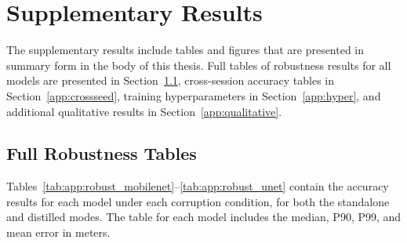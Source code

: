 \chapter{Supplementary Results}
\label{app:supplementary}

The supplementary results include tables and figures that are presented in summary form in the body of
this thesis. Full tables of robustness results for all models are presented in
Section~\ref{app:robustness}, cross-session accuracy tables in Section~\ref{app:crossseed}, training
hyperparameters in Section~\ref{app:hyper}, and additional qualitative results in
Section~\ref{app:qualitative}.

\section{Full Robustness Tables}
\label{app:robustness}

Tables~\ref{tab:app:robust_mobilenet}--\ref{tab:app:robust_unet} contain the accuracy results for each
model under each corruption condition, for both the standalone and distilled modes. The table for each
model includes the median, P90, P99, and mean error in meters.

